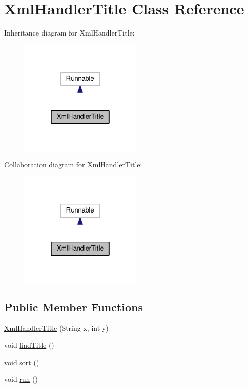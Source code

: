 \hypertarget{classXmlHandlerTitle}{\section{Xml\-Handler\-Title Class Reference}
\label{classXmlHandlerTitle}
}


Inheritance diagram for Xml\-Handler\-Title\-:
\nopagebreak
\begin{figure}[H]
\begin{center}
\leavevmode
\includegraphics[width=166pt]{classXmlHandlerTitle__inherit__graph}
\end{center}
\end{figure}


Collaboration diagram for Xml\-Handler\-Title\-:
\nopagebreak
\begin{figure}[H]
\begin{center}
\leavevmode
\includegraphics[width=166pt]{classXmlHandlerTitle__coll__graph}
\end{center}
\end{figure}
\subsection*{Public Member Functions}
\begin{DoxyCompactItemize}
\item 
\hyperlink{classXmlHandlerTitle_a41d8f5e4c21f2e3d9846593d1d7d5da6}{Xml\-Handler\-Title} (String x, int y)
\item 
void \hyperlink{classXmlHandlerTitle_a8bb351908c7504b82dc0dbfcfff5352c}{find\-Title} ()
\item 
void \hyperlink{classXmlHandlerTitle_a5ae3c12233674e2953bbfc51d19084c7}{sort} ()
\item 
void \hyperlink{classXmlHandlerTitle_ac7189c60a6cad49f37cac7a1b994abda}{run} ()
\end{DoxyCompactItemize}
